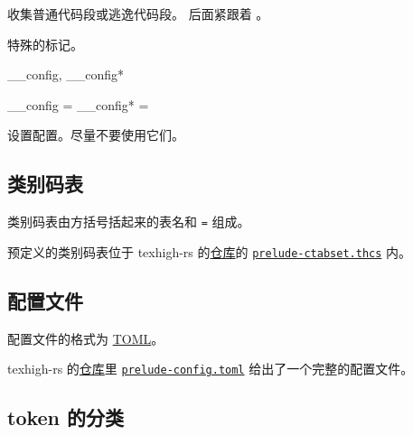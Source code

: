 \documentclass[class=article,openany]{cusdoc}[2025/09/29]
\begin{document}
\begin{function}{\THCollectRange}
  \begin{syntax}
    \V\THCollectRange {} \V\THrs {} \V\THre
    \V\THCollectRange {} \V\THes {} \V\THee
  \end{syntax}
收集普通代码段或逃逸代码段。 后面紧跟着 。
\end{function}

\begin{function}{\THPASS}
特殊的标记。
\end{function}

\begin{keyval}[path=high]{__config, __config*}
  \begin{syntax}
    __config  =  
    __config* =  
  \end{syntax}
设置配置。尽量不要使用它们。
\end{keyval}

\subsection{类别码表}\label{sec:ctab}

类别码表由方括号括起来的表名和 \texttt{=} 组成。

预定义的类别码表位于 texhigh-rs 的\href{https://github.com/Sophanatprime/texhigh-rs}{仓库}的 \href{https://github.com/Sophanatprime/texhigh-rs/blob/main/src/prelude-ctabset.thcs}{\texttt{prelude-ctabset.thcs}} 内。

\subsection{配置文件}\label{sec:config}

配置文件的格式为 \href{https://toml.io/}{TOML}。

texhigh-rs 的\href{https://github.com/Sophanatprime/texhigh-rs}{仓库}里 \href{https://github.com/Sophanatprime/texhigh-rs/blob/main/src/prelude-config.toml}{\texttt{prelude-config.toml}} 给出了一个完整的配置文件。

\subsection{token 的分类}
\end{document}
